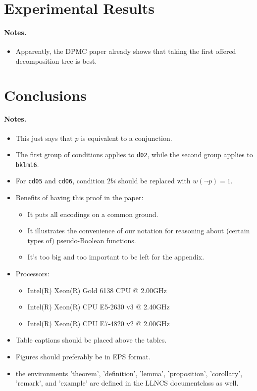 \documentclass[runningheads]{llncs}
\begin{document}
\section{Experimental Results}

\paragraph{Notes.}
\begin{itemize}
\item Apparently, the \textsc{DPMC} paper \cite{DBLP:conf/cp/DudekPV20} already
  shows that taking the first offered decomposition tree is best.
\end{itemize}

\section{Conclusions}

\paragraph{Notes.}
\begin{itemize}
\item This just says that $p$ is equivalent to a conjunction.
\item The first group of conditions applies to \texttt{d02}, while the second
  group applies to \texttt{bklm16}.
\item For \texttt{cd05} and \texttt{cd06}, condition $2bi$ should be replaced
  with $w(\neg p) = 1$.
\item Benefits of having this proof in the paper:
  \begin{itemize}
  \item It puts all encodings on a common ground.
  \item It illustrates the convenience of our notation for reasoning about
    (certain types of) pseudo-Boolean functions.
  \item It's too big and too important to be left for the appendix.
  \end{itemize}
\item Processors:
  \begin{itemize}
  \item Intel(R) Xeon(R) Gold 6138 CPU @ 2.00GHz
  \item Intel(R) Xeon(R) CPU E5-2630 v3 @ 2.40GHz
  \item Intel(R) Xeon(R) CPU E7-4820 v2 @ 2.00GHz
  \end{itemize}
\item Table captions should be placed above the tables.
\item Figures should preferably be in EPS format.
\item the environments 'theorem', 'definition', 'lemma', 'proposition',
  'corollary', 'remark', and 'example' are defined in the LLNCS documentclass as
  well.
\end{itemize}
\end{document}
